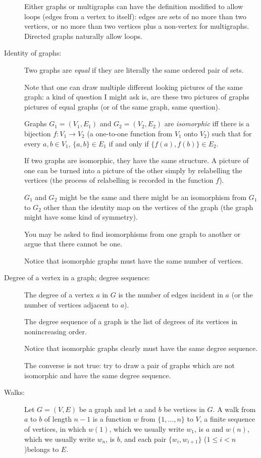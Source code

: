 \documentclass[12pt]{article}
\begin{document}
\begin{description}
Either graphs or multigraphs can have the definition modified to allow loops (edges from a vertex to itself):  edges are sets of no more than two vertices, or no more than two vertices plus a non-vertex for multigraphs.  Directed graphs naturally allow loops.

\item[Identity of graphs:]  Two graphs are {\em equal\/} if they are literally the same ordered pair of sets.

Note that one can draw multiple different looking pictures of the same graph:  a kind of question I might ask is, are these two pictures of graphs pictures of equal graphs (or of the same graph, same question).

Graphs $G_1 = (V_1,E_1)$ and $G_2=(V_2,E_2)$ are {\em isomorphic\/} iff there is a bijection $f:V_1 \rightarrow V_2$ (a one-to-one function from $V_1$ onto $V_2$) such that for every $a,b \in V_1$, $\{a,b\} \in E_1$ if and only if $\{f(a),f(b)\} \in E_2$.

If two graphs are isomorphic, they have the same structure.  A picture of one can be turned into a picture of the other simply by relabelling the vertices (the process of relabelling is recorded in the function $f$).

$G_1$ and $G_2$ might be the same and there might be an isomorphism from $G_1$ to $G_2$ other than the identity map on the vertices of the graph (the graph might have some kind of symmetry).

You may be asked to find isomorphisms from one graph to another or argue that there cannot be one.

Notice that isomorphic graphs must have the same number of vertices.

\item[Degree of a vertex in a graph;  degree sequence:]  The degree of a vertex $a$ in $G$ is the number of edges incident in $a$ (or the number of vertices adjacent to $a$).

The degree sequence of a graph is the list of degrees of its vertices in nonincreasing order.

Notice that isomorphic graphs clearly must have the same degree sequence.

The converse is not true:  try to draw a pair of graphs which are not isomorphic and have the same degree sequence.

\item[Walks:]  Let $G=(V,E)$ be a graph and let $a$ and $b$ be vertices in $G$.  A walk from $a$ to $b$ of length $n-1$ is a function $w$ from $\{1,\ldots,n\}$ to $V$, a finite sequence of vertices, in which $w(1)$, which we usually write $w_1$, is $a$ and $w(n)$, which we usually write $w_n$, is $b$, and each pair $\{w_i,w_{i+1}\}$ ($1 \leq i <n$)belongs to $E$.  


\end{description}
\end{document}
